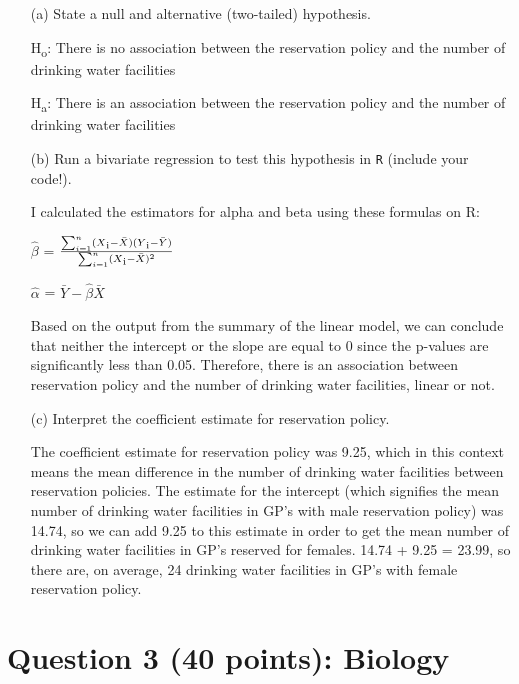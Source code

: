 \documentclass[12pt,letterpaper]{article}
\begin{document}
\newpage
\begin{enumerate}
	\item [(a)] State a null and alternative (two-tailed) hypothesis. 
	
	H\textsubscript{o}: There is no association between the reservation policy and the number of drinking water facilities
	
	H\textsubscript{a}: There is an association between the reservation policy and the number of drinking water facilities
	\item [(b)] Run a bivariate regression to test this hypothesis in \texttt{R} (include your code!).
	
		I calculated the estimators for alpha and beta using these formulas on R:
	
	$\hat{\beta}$ = $\frac{\sum_{i=1}^{n} (X\textsubscript{i}-\bar{X})(Y\textsubscript{i}-\bar{Y})}{\sum_{i=1}^{n}(X\textsubscript{i}-\bar{X})^2}$
	
	$\hat{\alpha}$ = $\bar{Y} - \hat{\beta}\bar{X}$
	
	 
	
	Based on the output from the summary of the linear model, we can conclude that neither the intercept or the slope are equal to 0 since the p-values are significantly less than 0.05. Therefore, there is an association between reservation policy and the number of drinking water facilities, linear or not.
	
	\item [(c)] Interpret the coefficient estimate for reservation policy.
		
		The coefficient estimate for reservation policy was 9.25, which in this context means the mean difference in the number of drinking water facilities between reservation policies. The estimate for the intercept (which signifies the mean number of drinking water facilities in GP's with male reservation policy) was 14.74, so we can add 9.25 to this estimate in order to get the mean number of drinking water facilities in GP's reserved for females. 14.74 + 9.25 = 23.99, so there are, on average, 24 drinking water facilities in GP's with female reservation policy. 
\end{enumerate}

\newpage
	\section*{Question 3 (40 points): Biology}
\end{document}
